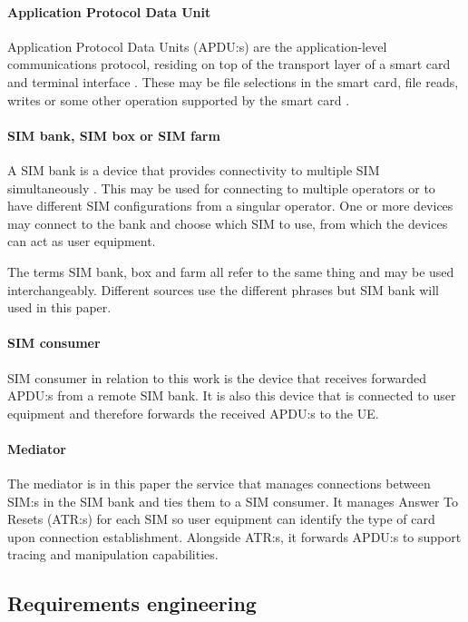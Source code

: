 \paragraph{Application Protocol Data Unit}

Application Protocol Data Units (APDU:s) are the application-level
communications protocol, residing on top of the transport layer of
a smart card and terminal interface \cite{etsi-ts-102-221}. These
may be file selections in the smart card, file reads, writes or
some other operation supported by the smart card
\cite{etsi-ts-102-221}.

\paragraph{SIM bank, SIM box or SIM farm}

A SIM bank is a device that provides connectivity to multiple SIM
simultaneously \cite{hyprms-sim-bank}. This may be used for
connecting to multiple operators or to have different SIM
configurations from a singular operator. One or more devices may
connect to the bank and choose which SIM to use, from which the
devices can act as user equipment.

The terms SIM bank, box and farm all refer to the same thing and
may be used interchangeably. Different sources use the different
phrases but SIM bank will used in this paper.

\paragraph{SIM consumer}

SIM consumer in relation to this work is the device that receives
forwarded APDU:s from a remote SIM bank. It is also this device
that is connected to user equipment and therefore forwards the
received APDU:s to the UE.

\paragraph{Mediator}

The mediator is in this paper the service that manages connections
between SIM:s in the SIM bank and ties them to a SIM consumer. It
manages Answer To Resets (ATR:s) for each SIM so user equipment can
identify the type of card upon connection establishment. Alongside
ATR:s, it forwards APDU:s to support tracing and manipulation
capabilities.

\subsection{Requirements engineering}

